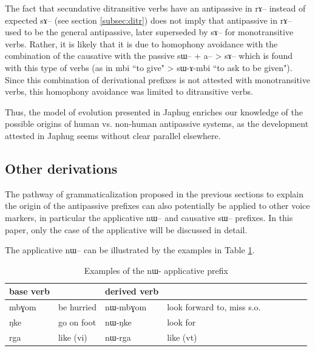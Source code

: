 \documentclass[oldfontcommands,oneside,a4paper,11pt]{article}
\newcommand{\ipa}[1]{{\phon \mbox{#1}}} %
\begin{document}
 The fact that secundative ditransitive verbs have an antipassive in \ipa{rɤ}-- instead of expected \ipa{sɤ}-- (see section \ref{subsec:ditr}) does not imply that antipassive in \ipa{rɤ}-- used to be the general antipassive, later superseded by \ipa{sɤ}-- for monotransitive verbs. Rather, it is likely that it is due to homophony avoidance with the combination of the causative with the passive \ipa{sɯ}-- + \ipa{a}-- > \ipa{sɤ}-- which is found with this type of verbs (as in \ipa{mbi} ``to give" > \ipa{sɯ-ɤ-mbi} ``to ask to be given"). Since this combination of derivational prefixes is not attested with monotransitive verbs, this homophony avoidance was limited to ditransitive verbs.



Thus, the model of evolution presented in Japhug enriches our knowledge of the possible origins of human vs. non-human antipassive systems, as the development attested in Japhug seems without clear parallel elsewhere.


%
\subsection{Other derivations} \label{sec:appl}
The pathway of grammaticalization proposed   in the previous sections to explain the origin of the antipassive prefixes can also potentially be applied to other voice markers, in particular the applicative \ipa{nɯ}-- and  causative \ipa{sɯ}-- prefixes. In this paper, only the case of the applicative will be discussed in detail.


The applicative \ipa{nɯ}-- can be illustrated by the examples in Table \ref{tab:applicative}.
\begin{table}[H]
\caption{Examples of the \ipa{nɯ}- applicative prefix}\label{tab:applicative}
\begin{tabular}{lllllllll} \toprule
base  verb  & &derived   verb &\\
\midrule
\ipa{mbɣom}  &	be hurried & \ipa{nɯ-mbɣom}  & look  forward to, miss s.o.\\
\ipa{ŋke}  &go on foot	& \ipa{nɯ-ŋke}  & look for \\
\ipa{rga}  &	like (vi) & \ipa{nɯ-rga}  &like (vt) \\
\bottomrule
\end{tabular}
\end{table}
\end{document}
